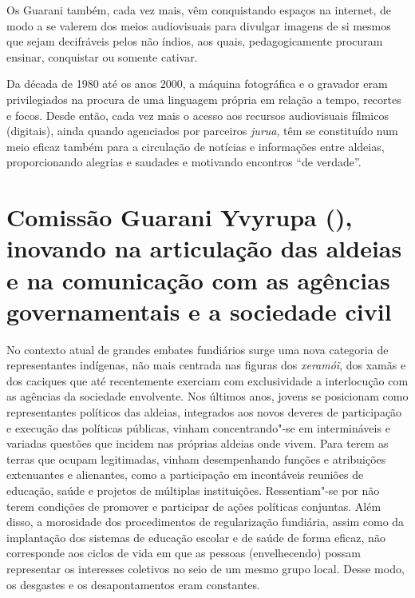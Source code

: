 Os Guarani também, cada vez mais, vêm conquistando espaços na internet,
de modo a se valerem dos meios audiovisuais para divulgar imagens de si
mesmos que sejam decifráveis pelos não índios, aos quais,
pedagogicamente procuram ensinar, conquistar ou somente cativar. 

Da década de 1980 até os anos 2000, a máquina fotográfica e o gravador
eram privilegiados na procura de uma linguagem própria em relação a
tempo, recortes e focos. Desde então, cada vez mais o acesso aos
recursos audiovisuais fílmicos (digitais), ainda quando agenciados por
parceiros \emph{jurua}, têm se constituído num meio eficaz também para a
circulação de notícias e informações entre aldeias, proporcionando
alegrias e saudades e motivando encontros ``de verdade''.

\section{Comissão Guarani Yvyrupa (), inovando na articulação das aldeias e na
comunicação com as agências governamentais e a sociedade civil}

No contexto atual de grandes embates fundiários surge uma nova categoria
de representantes indígenas, não mais centrada nas figuras dos
\emph{xeramóĩ}, dos xamãs e dos caciques que até
recentemente exerciam com exclusividade a interlocução com as agências
da sociedade envolvente. Nos últimos anos, jovens se posicionam como
representantes políticos das aldeias, integrados aos novos deveres de
participação e execução das políticas públicas, vinham concentrando"-se
em intermináveis e variadas questões que incidem nas próprias aldeias
onde vivem. Para terem as terras que ocupam legitimadas, vinham
desempenhando funções e atribuições extenuantes e alienantes, como a
participação em incontáveis reuniões de educação, saúde e projetos de
múltiplas instituições. Ressentiam"-se por não terem condições de
promover e participar de ações políticas conjuntas. Além disso, a
morosidade dos procedimentos de regularização fundiária, assim como da
implantação dos sistemas de educação escolar e de saúde de forma
eficaz, não corresponde aos ciclos de vida em que as pessoas
(envelhecendo) possam representar os interesses coletivos no seio de um
mesmo grupo local. Desse modo, os desgastes e os desapontamentos eram
constantes. 

